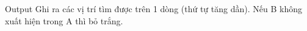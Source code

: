 Output
Ghi ra các vị trí tìm được trên 1 dòng (thứ tự tăng dần). Nếu B không xuất hiện trong A thì bỏ trắng.